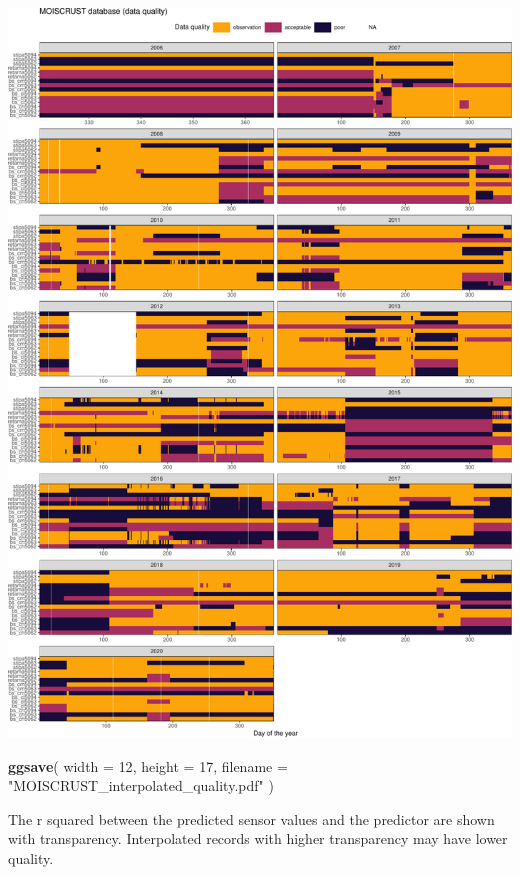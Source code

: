 \documentclass[]{article}
\newenvironment{Shaded}{\begin{snugshade}}{\end{snugshade}}
\newcommand{\DataTypeTok}[1]{\textcolor[rgb]{0.13,0.29,0.53}{#1}}
\newcommand{\DecValTok}[1]{\textcolor[rgb]{0.00,0.00,0.81}{#1}}
\newcommand{\KeywordTok}[1]{\textcolor[rgb]{0.13,0.29,0.53}{\textbf{#1}}}
\newcommand{\NormalTok}[1]{#1}
\newcommand{\StringTok}[1]{\textcolor[rgb]{0.31,0.60,0.02}{#1}}
\begin{document}
\includegraphics{moiscrust_files/figure-latex/unnamed-chunk-23-1.pdf}

\begin{Shaded}
\begin{Highlighting}[]
\KeywordTok{ggsave}\NormalTok{(}
  \DataTypeTok{width =} \DecValTok{12}\NormalTok{, }
  \DataTypeTok{height =} \DecValTok{17}\NormalTok{, }
  \DataTypeTok{filename =} \StringTok{"MOISCRUST_interpolated_quality.pdf"}
\NormalTok{  )}
\end{Highlighting}
\end{Shaded}

The r squared between the predicted sensor values and the predictor are
shown with transparency. Interpolated records with higher transparency
may have lower quality.
\end{document}
